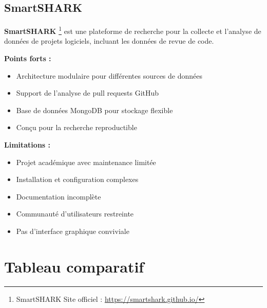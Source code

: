 \subsection{SmartSHARK}

\textbf{SmartSHARK} \footnote{SmartSHARK Site officiel : \url{https://smartshark.github.io/}}  est une plateforme de recherche pour la collecte et l'analyse de données de projets logiciels, incluant les données de revue de code.

\textbf{Points forts :}
\begin{itemize}
    \item Architecture modulaire pour différentes sources de données
    \item Support de l'analyse de pull requests GitHub
    \item Base de données MongoDB pour stockage flexible
    \item Conçu pour la recherche reproductible
\end{itemize}

\textbf{Limitations :}
\begin{itemize}
    \item Projet académique avec maintenance limitée
    \item Installation et configuration complexes
    \item Documentation incomplète
    \item Communauté d'utilisateurs restreinte
    \item Pas d'interface graphique conviviale
\end{itemize}

\section{Tableau comparatif}


